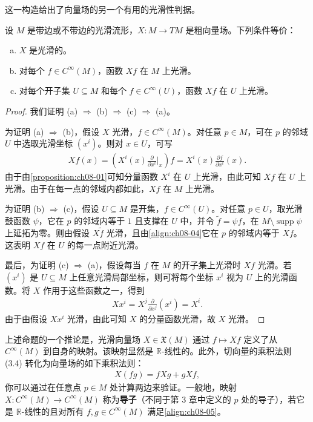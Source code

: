 \documentclass[../../main.tex]{subfiles}
\begin{document}
这一构造给出了向量场的另一个有用的光滑性判据。

\begin{proposition}\label{proposition:ch08-14}
设 $M$ 是带边或不带边的光滑流形，$X\colon M\to TM$ 是粗向量场。下列条件等价：
\begin{enumerate}[(a)]
\item $X$ 是光滑的。
\item 对每个 $f\in C^\infty(M)$，函数 $Xf$ 在 $M$ 上光滑。
\item 对每个开子集 $U\subseteq M$ 和每个 $f\in C^\infty(U)$，函数 $Xf$ 在 $U$ 上光滑。
\end{enumerate}
\end{proposition}

\begin{proof}
我们证明 (a) $\Rightarrow$ (b) $\Rightarrow$ (c) $\Rightarrow$ (a)。

为证明 (a) $\Rightarrow$ (b)，假设 $X$ 光滑，$f\in C^\infty(M)$。对任意 $p\in M$，可在 $p$ 的邻域 $U$ 中选取光滑坐标 $(x^i)$。则对 $x\in U$，可写
\begin{align*}
Xf(x)=\left(X^i(x)\frac{\partial}{\partial x^i}\bigg|_x\right)f=X^i(x)\frac{\partial f}{\partial x^i}(x).
\end{align*}
由于由\cref{proposition:ch08-01}可知分量函数 $X^i$ 在 $U$ 上光滑，由此可知 $Xf$ 在 $U$ 上光滑。由于在每一点的邻域内都如此，$Xf$ 在 $M$ 上光滑。

为证明 (b) $\Rightarrow$ (c)，假设 $U\subseteq M$ 是开集，$f\in C^\infty(U)$。对任意 $p\in U$，取光滑鼓函数 $\psi$，它在 $p$ 的邻域内等于 $1$ 且支撑在 $U$ 中，并令 $\widetilde{f}=\psi f$，在 $M\setminus\operatorname{supp}\psi$ 上延拓为零。则由假设 $X\widetilde{f}$ 光滑，且由\eqref{align:ch08-04}它在 $p$ 的邻域内等于 $Xf$。这表明 $Xf$ 在 $U$ 的每一点附近光滑。

最后，为证明 (c) $\Rightarrow$ (a)，假设每当 $f$ 在 $M$ 的开子集上光滑时 $Xf$ 光滑。若 $(x^i)$ 是 $U\subseteq M$ 上任意光滑局部坐标，则可将每个坐标 $x^i$ 视为 $U$ 上的光滑函数。将 $X$ 作用于这些函数之一，得到
\begin{align*}
Xx^i=X^j\frac{\partial}{\partial x^j}(x^i)=X^i.
\end{align*}
由于由假设 $Xx^i$ 光滑，由此可知 $X$ 的分量函数光滑，故 $X$ 光滑。
\end{proof}

上述命题的一个推论是，光滑向量场 $X\in\mathfrak{X}(M)$ 通过 $f\mapsto Xf$ 定义了从 $C^\infty(M)$ 到自身的映射。该映射显然是 $\mathbb{R}$-线性的。此外，切向量的乘积法则 (3.4) 转化为向量场的如下乘积法则：
\begin{align}
X(fg)=fXg+gXf,\label{align:ch08-05}
\end{align}
你可以通过在任意点 $p\in M$ 处计算两边来验证。一般地，映射 $X\colon C^\infty(M)\to C^\infty(M)$ 称为\textbf{导子}（不同于第 3 章中定义的 $p$ 处的导子），若它是 $\mathbb{R}$-线性的且对所有 $f,g\in C^\infty(M)$ 满足\eqref{align:ch08-05}。
\end{document}
